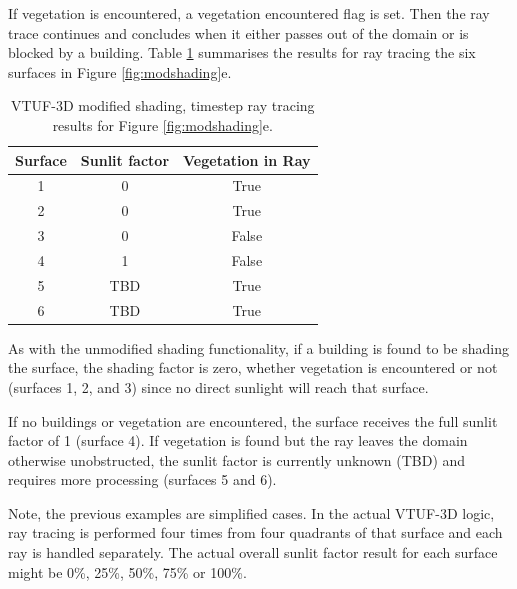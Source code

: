 \documentclass[preprint,12pt,authoryear]{elsarticle}
\begin{document}

If vegetation is encountered, a vegetation encountered flag is set. Then the ray trace continues and concludes when it either passes out of the domain or is blocked by a building. Table \ref{tab:raytraceresults} summarises the results for ray tracing the six surfaces in Figure \ref{fig:modshading}e. 

\begin{table}[!htbp]
\caption[VTUF-3D modified shading, timestep ray tracing results for Figure \ref{fig:modshading}e]{VTUF-3D modified shading, timestep ray tracing results for Figure \ref{fig:modshading}e.} 
\label{tab:raytraceresults}
  \begin{tabular}{  | c | c | c | } 
	\hline  \textbf{Surface} & \textbf{Sunlit factor} & \textbf{Vegetation in Ray} \\ \hline
	1 & 0 & True   \\ \hline
	2 & 0 & True   \\ \hline
	3 & 0 & False  \\ \hline
	4 & 1 & False  \\ \hline
	5 & TBD & True \\ \hline
	6 & TBD & True \\ \hline	
  \end{tabular} 
\end{table}

As with the unmodified shading functionality, if a building is found to be shading the surface, the shading factor is zero, whether vegetation is encountered or not (surfaces 1, 2, and 3) since no direct sunlight will reach that surface. 

If no buildings or vegetation are encountered, the surface receives the full sunlit factor of 1 (surface 4). If vegetation is found but the ray leaves the domain otherwise unobstructed, the sunlit factor is currently unknown (TBD) and requires more processing (surfaces 5 and 6).

Note, the previous examples are simplified cases. In the actual VTUF-3D logic, ray tracing is performed four times from four quadrants of that surface and each ray is handled separately. The actual overall sunlit factor result for each surface might be 0\%, 25\%, 50\%, 75\% or 100\%.
\end{document}
